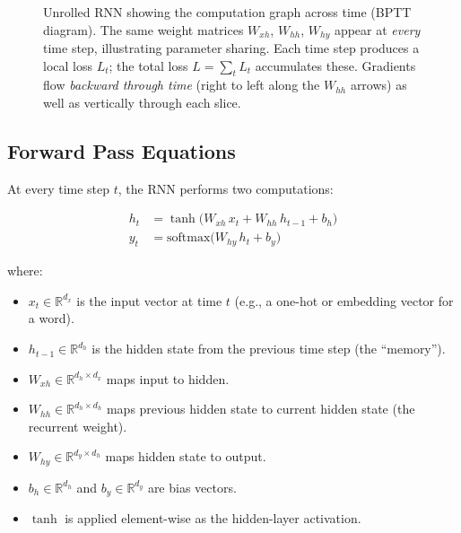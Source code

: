 \documentclass[12pt,a4paper]{article}
\newcommand{\xt}{x_t}
\newcommand{\ht}{h_t}
\newcommand{\yt}{y_t}
\newcommand{\Whh}{W_{hh}}
\newcommand{\Wxh}{W_{xh}}
\newcommand{\Why}{W_{hy}}
\newcommand{\htmo}{h_{t-1}}
\begin{document}
\begin{figure}[ht]
\caption{Unrolled RNN showing the computation graph across time (BPTT diagram).
The same weight matrices $\Wxh$, $\Whh$, $\Why$ appear at \emph{every}
time step, illustrating parameter sharing.  Each time step produces a local
loss $L_t$; the total loss $L = \sum_t L_t$ accumulates these.  Gradients flow
\emph{backward through time} (right to left along the $\Whh$ arrows) as well
as vertically through each slice.}
\label{fig:rnn_unfolded}
\end{figure}

\subsection{Forward Pass Equations}
\label{subsec:forward_pass}

At every time step $t$, the RNN performs two computations:

\begin{align}
  \ht &= \tanh\!\bigl(\Wxh\, \xt + \Whh\, \htmo + b_h\bigr)
  \label{eq:hidden_state} \\[4pt]
  \yt &= \mathrm{softmax}\!\bigl(\Why\, \ht + b_y\bigr)
  \label{eq:output}
\end{align}

where:

\begin{itemize}[noitemsep]
  \item $\xt \in \mathbb{R}^{d_x}$ is the input vector at time $t$ (e.g., a
        one-hot or embedding vector for a word).
  \item $\htmo \in \mathbb{R}^{d_h}$ is the hidden state from the previous
        time step (the ``memory'').
  \item $\Wxh \in \mathbb{R}^{d_h \times d_x}$ maps input to hidden.
  \item $\Whh \in \mathbb{R}^{d_h \times d_h}$ maps previous hidden state to
        current hidden state (the recurrent weight).
  \item $\Why \in \mathbb{R}^{d_y \times d_h}$ maps hidden state to output.
  \item $b_h \in \mathbb{R}^{d_h}$ and $b_y \in \mathbb{R}^{d_y}$ are bias
        vectors.
  \item $\tanh$ is applied element-wise as the hidden-layer activation.
\end{itemize}
\end{document}
